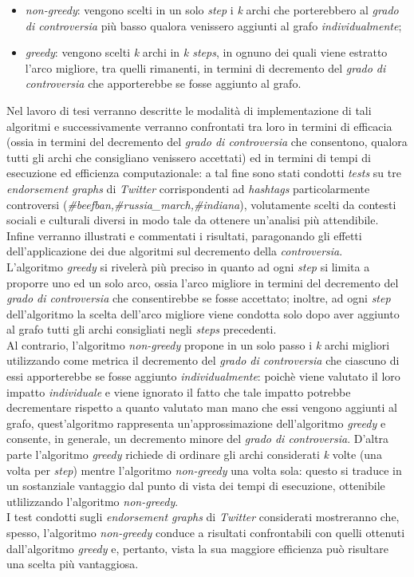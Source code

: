 \documentclass[trieste,12pt]{toptesi}
\begin{document}
\begin{itemize}
\item \textit{non-greedy}: vengono scelti in un solo \textit{step} i \textit{k} archi che porterebbero al \textit{grado di controversia} più basso qualora venissero aggiunti al grafo \textit{individualmente};
\item \textit{greedy}: vengono scelti \textit{k} archi in \textit{k steps}, in ognuno dei quali viene estratto l'arco migliore, tra quelli rimanenti, in termini di decremento del \textit{grado di controversia} che apporterebbe se fosse aggiunto al grafo.
\end{itemize}
Nel lavoro di tesi verranno descritte le modalità di implementazione di tali algoritmi e successivamente verranno confrontati tra loro in termini di efficacia (ossia in termini del decremento del \textit{grado di controversia} che consentono, qualora tutti gli archi che consigliano venissero accettati) ed in termini di tempi di esecuzione ed efficienza computazionale: a tal fine sono stati condotti \textit{tests} su tre \textit{endorsement graphs} di \textit{Twitter} corrispondenti ad \textit{hashtags} particolarmente controversi (\textit{\#beefban,\#russia\_march,\#indiana}), volutamente scelti da contesti sociali e culturali diversi in modo tale da ottenere un'analisi più attendibile. Infine verranno illustrati e commentati i risultati, paragonando gli effetti dell'applicazione dei due algoritmi sul decremento della \textit{controversia}. \\L'algoritmo \textit{greedy} si rivelerà più preciso in quanto ad ogni \textit{step} si limita a proporre uno ed un solo arco, ossia l'arco migliore in termini del decremento del \textit{grado di controversia} che consentirebbe se fosse accettato; inoltre, ad ogni \textit{step} dell'algoritmo la scelta dell'arco migliore viene condotta solo dopo aver aggiunto al grafo tutti gli archi consigliati negli \textit{steps} precedenti.\\Al contrario, l'algoritmo \textit{non-greedy} propone in un solo passo i \textit{k} archi migliori utilizzando come metrica il decremento del \textit{grado di controversia} che ciascuno di essi apporterebbe se fosse aggiunto \textit{individualmente}: poichè viene valutato il loro impatto \textit{individuale} e viene ignorato il fatto che tale impatto potrebbe decrementare rispetto a quanto valutato man mano che essi vengono aggiunti al grafo, quest'algoritmo rappresenta un'approssimazione dell'algoritmo \textit{greedy} e consente, in generale, un decremento minore del \textit{grado di controversia}. D'altra parte l'algoritmo \textit{greedy} richiede di ordinare gli archi considerati \textit{k} volte (una volta per \textit{step})  mentre l'algoritmo \textit{non-greedy} una volta sola: questo si traduce in un sostanziale vantaggio dal punto di vista dei tempi di esecuzione, ottenibile utlilizzando l'algoritmo \textit{non-greedy}.\\I test condotti sugli \textit{endorsement graphs} di \textit{Twitter} considerati mostreranno che, spesso, l'algoritmo \textit{non-greedy} conduce a risultati confrontabili con quelli ottenuti dall'algoritmo \textit{greedy} e, pertanto, vista la sua maggiore efficienza può risultare una scelta più vantaggiosa.
\end{document}
